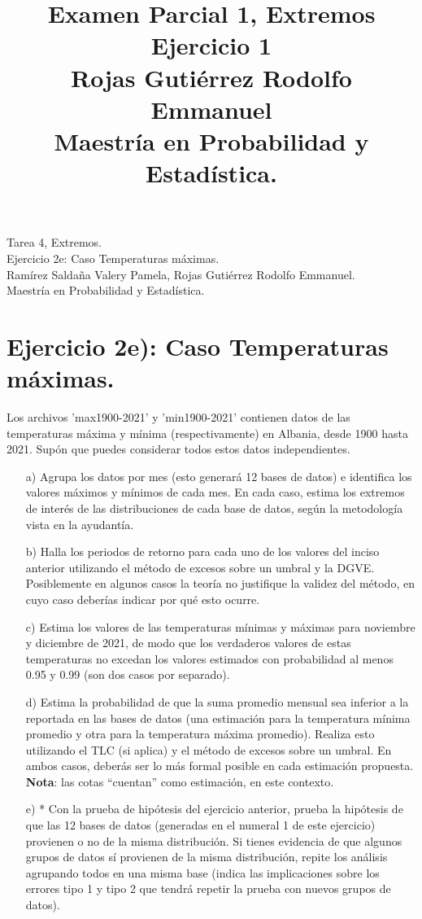 \documentclass[10.5pt,notitlepage]{article}
\title{Examen Parcial 1, Extremos \\
Ejercicio 1\\
Rojas Gutiérrez Rodolfo Emmanuel\\ 
Maestría en Probabilidad y Estadística.}
\author{}
\theoremstyle{plain}
\begin{document}
\begin{flushleft}
Tarea 4, Extremos.\\
Ejercicio 2e: Caso Temperaturas máximas.\\   
Ramírez Saldaña Valery Pamela, Rojas Gutiérrez Rodolfo Emmanuel.\\
Maestría en Probabilidad y Estadística.
\end{flushleft}

\section{Ejercicio 2e): Caso Temperaturas máximas.}
\setcounter{exo}{1}
\begin{exo}
\item Los archivos 'max1900-2021' y 'min1900-2021' contienen datos de las temperaturas máxima y mínima (respectivamente) en Albania, desde 1900 hasta 2021. Supón que puedes considerar todos estos datos independientes.
\begin{itemize}
\item[a)] Agrupa los datos por mes (esto generará 12 bases de datos) e identifica los valores máximos y mínimos de cada mes. En cada caso, estima los extremos de interés de las distribuciones de cada base de datos, según la metodología vista en la ayudantía.

\item[b)] Halla los periodos de retorno para cada uno de los valores del inciso anterior utilizando el método de excesos sobre un umbral y la DGVE. Posiblemente en algunos casos la teoría no justifique la validez del método, en cuyo caso deberías indicar por qué esto ocurre.

\item[c)] Estima los valores de las temperaturas mínimas y máximas para noviembre y diciembre de 2021, de modo que los verdaderos valores de estas temperaturas no excedan los valores estimados con probabilidad al menos 0.95 y 0.99 (son dos casos por separado).

\item[d)] Estima la probabilidad de que la suma promedio mensual sea inferior a la reportada en las bases de datos (una estimación para la temperatura mínima promedio y otra para la temperatura máxima promedio). Realiza esto utilizando el TLC (si aplica) y el método de excesos sobre un umbral. En ambos casos, deberás ser lo más formal posible en cada estimación propuesta. \textbf{Nota}: las cotas ``cuentan'' como estimación, en este contexto.

\item[e)]* Con la prueba de hipótesis del ejercicio anterior, prueba la hipótesis de que las 12 bases de datos (generadas en el numeral 1 de este ejercicio) provienen o no de la misma distribución. Si tienes evidencia de que algunos grupos de datos sí provienen de la misma distribución, repite los análisis agrupando todos en una misma base (indica las implicaciones sobre los errores tipo 1 y tipo 2 que tendrá repetir la prueba con nuevos grupos de datos).
\end{itemize}
\end{exo}
\end{document}
